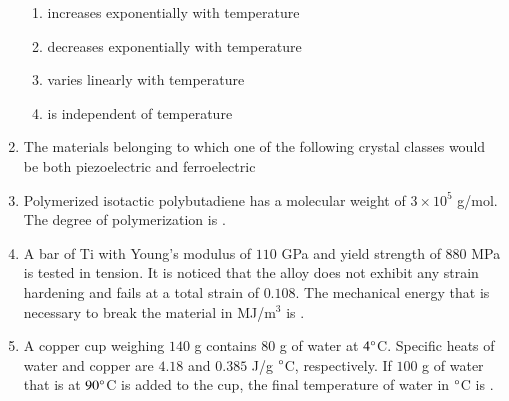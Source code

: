 \documentclass[a4paper,10pt]{article}
\begin{document}
\begin{enumerate}
    \hfill{}
    \begin{enumerate}[label=\Alph*)]
        \item increases exponentially with temperature
        \item decreases exponentially with temperature
        \item varies linearly with temperature
        \item is independent of temperature
    \end{enumerate}
    
    \item The materials belonging to which one of the following crystal classes would be both piezoelectric and ferroelectric
    
    \hfill{}
    \begin{enumerate}[label=\Alph*)]
    \end{enumerate}
    
    \item Polymerized isotactic polybutadiene has a molecular weight of $3 \times 10^5$ g/mol. The degree of polymerization is \underline{\hspace{2cm}}.
    
    \hfill{}
    
    \item A bar of Ti with Young's modulus of $110$ GPa and yield strength of $880$ MPa is tested in tension. It is noticed that the alloy does not exhibit any strain hardening and fails at a total strain of $0.108$. The mechanical energy that is necessary to break the material in MJ/m$^3$ is \underline{\hspace{2cm}}.
    
    \hfill{}
    
    \item A copper cup weighing $140$ g contains $80$ g of water at $4 \degree$C. Specific heats of water and copper are $4.18$ and $0.385$ J/g $\degree$C, respectively. If $100$ g of water that is at $90 \degree$C is added to the cup, the final temperature of water in $\degree$C is \underline{\hspace{2cm}}.
    

\end{enumerate}
\end{document}
